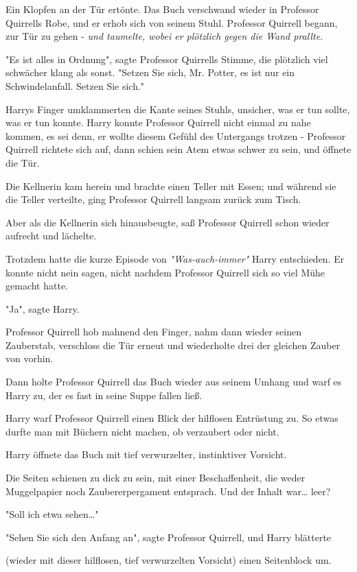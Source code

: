 {Ein Klopfen an der Tür ertönte. Das Buch verschwand wieder in Professor Quirrells Robe, und er erhob sich von seinem Stuhl. Professor Quirrell begann, zur Tür zu gehen - \emph{und taumelte, wobei er plötzlich gegen die Wand prallte.}

"Es ist alles in Ordnung", sagte Professor Quirrells Stimme, die plötzlich viel schwächer klang als sonst. "Setzen Sie sich, Mr. Potter, es ist nur ein Schwindelanfall. Setzen Sie sich."

Harrys Finger umklammerten die Kante seines Stuhls, unsicher, was er tun sollte, was er tun konnte. Harry konnte Professor Quirrell nicht einmal zu nahe kommen, es sei denn, er wollte diesem Gefühl des Untergangs trotzen - Professor Quirrell richtete sich auf, dann schien sein Atem etwas schwer zu sein, und öffnete die Tür.

Die Kellnerin kam herein und brachte einen Teller mit Essen; und während sie die Teller verteilte, ging Professor Quirrell langsam zurück zum Tisch.

Aber als die Kellnerin sich hinausbeugte, saß Professor Quirrell schon wieder aufrecht und lächelte.

Trotzdem hatte die kurze Episode von \emph{"Was-auch-immer"} Harry entschieden. Er konnte nicht nein sagen, nicht nachdem Professor Quirrell sich so viel Mühe gemacht hatte.

"Ja", sagte Harry.

Professor Quirrell hob mahnend den Finger, nahm dann wieder seinen Zauberstab, verschloss die Tür erneut und wiederholte drei der gleichen Zauber von vorhin.

Dann holte Professor Quirrell das Buch wieder aus seinem Umhang und warf es Harry zu, der es fast in seine Suppe fallen ließ.

Harry warf Professor Quirrell einen Blick der hilflosen Entrüstung zu. So etwas durfte man mit Büchern nicht machen, ob verzaubert oder nicht.

Harry öffnete das Buch mit tief verwurzelter, instinktiver Vorsicht.

Die Seiten schienen zu dick zu sein, mit einer Beschaffenheit, die weder Muggelpapier noch Zaubererpergament entsprach. Und der Inhalt war… leer?

"Soll ich etwa sehen…"

"Sehen Sie sich den Anfang an", sagte Professor Quirrell, und Harry blätterte

(wieder mit dieser hilflosen, tief verwurzelten Vorsicht) einen Seitenblock um.

}
